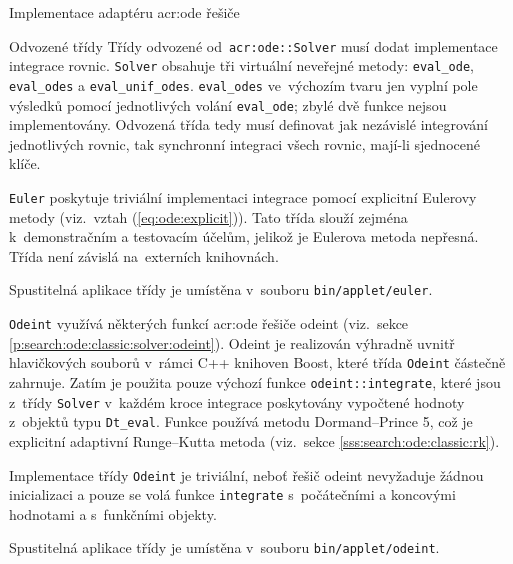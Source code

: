 \documentclass[thesis=M,czech]{FITthesis}[2012/06/26]
\newcommand{\acrlabel}[1]{acr:#1}
\newcommand{\acr}[1]{\acrshort{\acrlabel{#1}}}
\newcommand{\id}[1]{\texttt{#1}}
\newcommand{\rf}[1]{\ref{#1}}
\newcommand{\rfeq}[1]{(\rf{eq:#1})}
\newcommand{\binDir}{\id{bin}}
\newcommand{\appletDir}{\id{\binDir{}/\-applet}}
\newcommand{\appletFn}[1]{\id{\appletDir{}/\-#1}}
\begin{document}
\begin{section}{Implementace adaptéru \acr{ode} řešiče}

\begin{subsection}{Odvozené třídy}
\label{ss:impl:ode:derived}
Třídy odvozené od~\id{\acr{ode}::\-Solver}
musí dodat implementace integrace rovnic.
\id{Solver} obsahuje tři virtuální neveřejné metody:
\id{eval\_\-ode}, \id{eval\_\-odes}
a \id{eval\_\-unif\_\-odes}.
\id{eval\_\-odes} ve~výchozím tvaru
jen vyplní pole výsledků pomocí
jednotlivých volání \id{eval\_\-ode};
zbylé dvě funkce nejsou implementovány.
Odvozená třída tedy musí definovat
jak nezávislé integrování jednotlivých rovnic,
tak synchronní integraci všech rovnic,
mají-li sjednocené klíče.


\begin{paragraph}{\id{Euler}}
\label{p:impl:ode:derived:euler}
poskytuje triviální implementaci integrace
pomocí explicitní Eulerovy metody
(viz.~vztah \rfeq{ode:explicit}).
Tato třída slouží zejména k~demonstračním a testovacím účelům,
jelikož je Eulerova metoda nepřesná.
Třída není závislá na~externích knihovnách.

Spustitelná aplikace třídy je umístěna v~souboru \appletFn{euler}.
\end{paragraph} %


\begin{paragraph}{\id{Odeint}}
\label{p:impl:ode:derived:odeint}
využívá některých funkcí \acr{ode} řešiče odeint
(viz.~sekce \rf{p:search:ode:classic:solver:odeint}).
Odeint je realizován výhradně uvnitř hlavičkových souborů
v~rámci C++ knihoven Boost,
které třída \id{Odeint} částečně zahrnuje.
Zatím je použita pouze výchozí funkce
\id{odeint::\-integrate},
které jsou z~třídy \id{Solver}
v~každém kroce integrace poskytovány vypočtené
hodnoty z~objektů typu \id{Dt\_\-eval}.
Funkce používá metodu Dormand--Prince 5,
což je explicitní adaptivní Runge--Kutta metoda
(viz.~sekce \rf{sss:search:ode:classic:rk}).

Implementace třídy \id{Odeint} je triviální,
neboť řešič odeint nevyžaduje žádnou
inicializaci a pouze se volá funkce \id{integrate}
s~počátečními a koncovými hodnotami
a s~funkčními objekty.

Spustitelná aplikace třídy je umístěna v~souboru \appletFn{odeint}.
\end{paragraph} %


\end{subsection} %


\end{section} %
\end{document}
